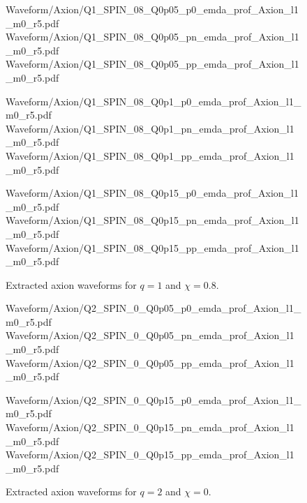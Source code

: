 \begin{figure}[p]
\centering

{Waveform/Axion/Q1_SPIN_08_Q0p05_p0_emda_prof_Axion_l1_m0_r5.pdf}
\hfill
{}
{Waveform/Axion/Q1_SPIN_08_Q0p05_pn_emda_prof_Axion_l1_m0_r5.pdf}
\hfill
{}
{Waveform/Axion/Q1_SPIN_08_Q0p05_pp_emda_prof_Axion_l1_m0_r5.pdf}

\vspace{0.6em}

{Waveform/Axion/Q1_SPIN_08_Q0p1_p0_emda_prof_Axion_l1_m0_r5.pdf}
\hfill
{}
{Waveform/Axion/Q1_SPIN_08_Q0p1_pn_emda_prof_Axion_l1_m0_r5.pdf}
\hfill
{}
{Waveform/Axion/Q1_SPIN_08_Q0p1_pp_emda_prof_Axion_l1_m0_r5.pdf}

\vspace{0.6em}

{Waveform/Axion/Q1_SPIN_08_Q0p15_p0_emda_prof_Axion_l1_m0_r5.pdf}
\hfill
{}
{Waveform/Axion/Q1_SPIN_08_Q0p15_pn_emda_prof_Axion_l1_m0_r5.pdf}
\hfill
{}
{Waveform/Axion/Q1_SPIN_08_Q0p15_pp_emda_prof_Axion_l1_m0_r5.pdf}

\caption{Extracted axion waveforms for $q=1$ and $\chi=0.8$.}
\label{fig:axion_catalog_q1_chi08}
\end{figure}
\begin{figure}[p]
\centering

{Waveform/Axion/Q2_SPIN_0_Q0p05_p0_emda_prof_Axion_l1_m0_r5.pdf}
\hfill
{}
{Waveform/Axion/Q2_SPIN_0_Q0p05_pn_emda_prof_Axion_l1_m0_r5.pdf}
\hfill
{}
{Waveform/Axion/Q2_SPIN_0_Q0p05_pp_emda_prof_Axion_l1_m0_r5.pdf}

\vspace{0.6em}

{Waveform/Axion/Q2_SPIN_0_Q0p15_p0_emda_prof_Axion_l1_m0_r5.pdf}
\hfill
{}
{Waveform/Axion/Q2_SPIN_0_Q0p15_pn_emda_prof_Axion_l1_m0_r5.pdf}
\hfill
{}
{Waveform/Axion/Q2_SPIN_0_Q0p15_pp_emda_prof_Axion_l1_m0_r5.pdf}

\caption{Extracted axion waveforms for $q=2$ and $\chi=0$.}
\label{fig:axion_catalog_q2_chi0}
\end{figure}

